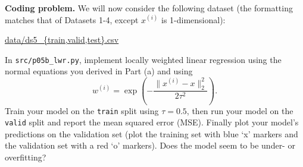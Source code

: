 \clearpage
\item {} \textbf{Coding problem.}
We will now consider the following dataset (the
formatting matches that of Datasets 1-4, except $x^{(i)}$ is 1-dimensional):
\begin{center}
	\url{data/ds5_{train,valid,test}.csv}	
\end{center}
In \texttt{src/p05b\_lwr.py}, implement locally weighted linear regression
using the normal equations you derived in Part (a) and using
%
\begin{equation*}
	w^{(i)} = \exp\left(-\frac{\|x^{(i)} - x\|_2^2}{2\tau^2}\right).
\end{equation*}
%
Train your model on the \texttt{train} split using $\tau = 0.5$, then run your
model on the \texttt{valid} split and report the mean squared error (MSE).
Finally plot your model's predictions on the validation set (plot the
training set with blue `x' markers and the validation set with a red `o'
markers). Does the model seem to be under- or overfitting?

\ifnum{} {
  
} \fi
